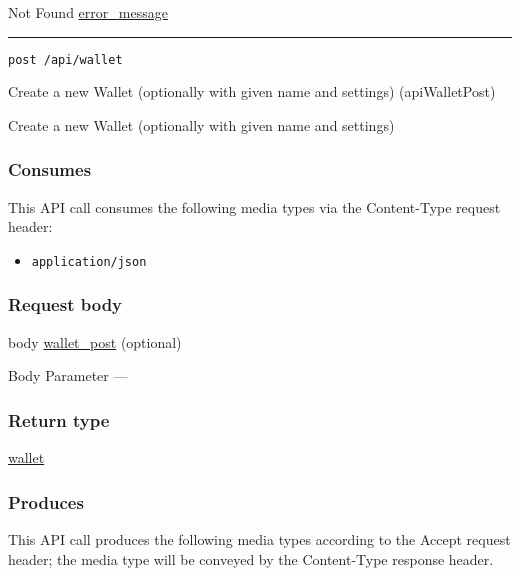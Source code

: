 Not Found \protect\hyperlink{error_message}{error\_message}

\begin{center}\rule{0.5\linewidth}{\linethickness}\end{center}

\protect\hypertarget{apiWalletPost}{}{}

\begin{verbatim}
post /api/wallet
\end{verbatim}

Create a new Wallet (optionally with given name and settings)
({apiWalletPost})

Create a new Wallet (optionally with given name and settings)

\hypertarget{consumes-42}{%
\subsubsection{Consumes}\label{consumes-42}}

This API call consumes the following media types via the {Content-Type}
request header:

\begin{itemize}
\tightlist
\item
  \texttt{application/json}
\end{itemize}

\hypertarget{request-body-42}{%
\subsubsection{Request body}\label{request-body-42}}

body \protect\hyperlink{wallet_post}{wallet\_post} (optional)

{Body Parameter} ---

\hypertarget{return-type-101}{%
\subsubsection{Return type}\label{return-type-101}}

\protect\hyperlink{wallet}{wallet}

\hypertarget{produces-130}{%
\subsubsection{Produces}\label{produces-130}}

This API call produces the following media types according to the
{Accept} request header; the media type will be conveyed by the
{Content-Type} response header.

